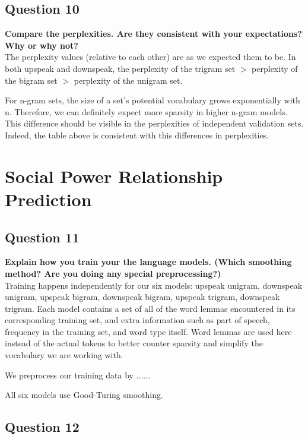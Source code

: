 \documentclass{article} %
\begin{document}
\subsection*{Question 10}

\textbf{Compare the perplexities. Are they consistent with your expectations? Why or why not?}
\\

The perplexity values (relative to each other) are as we expected them to be. In both upspeak and downspeak, the perplexity of the trigram set $>$ perplexity of the bigram set $>$ perplexity of the unigram set.

For n-gram sets, the size of a set's potential vocabulary grows exponentially with n. Therefore, we can definitely expect more sparsity in higher n-gram models. This difference should be visible in the perplexities of independent validation sets. Indeed, the table above is consistent with this differences in perplexities.


\section{Social Power Relationship Prediction}


\subsection*{Question 11}

\textbf{Explain how you train your the language models. (Which smoothing method? Are you doing any special preprocessing?)}
\\

Training happens independently for our six models: upspeak unigram, downspeak unigram, upspeak bigram, downspeak bigram, upspeak trigram, downspeak trigram. Each model contains a set of all of the word lemmas encountered in its corresponding training set, and extra information such as part of speech, frequency in the training set, and word type itself. Word lemmas are used here instead of the actual tokens to better counter sparsity and simplify the vocabulary we are working with.

We preprocess our training data by ......

All six models use Good-Turing smoothing.

\subsection*{Question 12}
\end{document}
